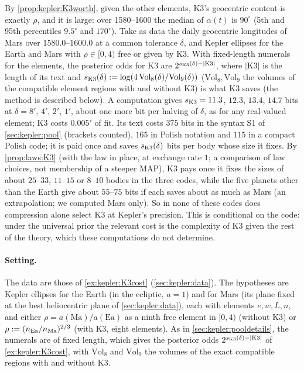 \begin{example}\label{ex:kepler:K3cost}
By \cref{prop:kepler:K3worth}, given the other elements, $\mathrm{K3}$'s geocentric content is exactly $\rho$, and it is large: over 1580--1600 the median of $\alpha(t)$ is $90^\circ$ (5th and 95th percentiles $9.5^\circ$ and $170^\circ$). Take as data the daily geocentric longitudes of Mars over 1580.0--1600.0 at a common tolerance $\delta$, and Kepler ellipses for the Earth and Mars with $\rho\in[0,4)$ free or given by $\mathrm{K3}$. With fixed-length numerals for the elements, the posterior odds for $\mathrm{K3}$ are $2^{s_{\rm K3}(\delta)-\lvert\mathrm{K3}\rvert}$, where $\lvert\mathrm{K3}\rvert$ is the length of its text and $s_{\rm K3}(\delta):=\log(4\,\mathrm{Vol}_8(\delta)/\mathrm{Vol}_9(\delta))$ ($\mathrm{Vol}_8,\mathrm{Vol}_9$ the volumes of the compatible element regions with and without $\mathrm{K3}$) is what $\mathrm{K3}$ saves (the method is described below). A computation gives $s_{\rm K3}=11.3$, $12.3$, $13.4$, $14.7$ bits at $\delta=8'$, $4'$, $2'$, $1'$, about one more bit per halving of $\delta$, as for any real-valued element; $\mathrm{K3}$ costs $0.005'$ of fit. Its text costs $375$ bits in the syntax S1 of \cref{sec:kepler:pool} (brackets counted), $165$ in Polish notation and $115$ in a compact Polish code; it is paid once and saves $s_{\rm K3}(\delta)$ bits per body whose size it fixes. By \cref{prop:laws:K3} (with the law in place, at exchange rate $1$; a comparison of law choices, not membership of a steeper MAP), $\mathrm{K3}$ pays once it fixes the sizes of about $25$--$33$, $11$--$15$ or $8$--$10$ bodies in the three codes, while the five planets other than the Earth give about $55$--$75$ bits if each saves about as much as Mars (an extrapolation; we computed Mars only). So in none of these codes does compression alone select $\mathrm{K3}$ at Kepler's precision. This is conditional on the code: under the universal prior the relevant cost is the complexity of $\mathrm{K3}$ given the rest of the theory, which these computations do not determine.
\end{example}

\paragraph{Setting.} The data are those of \cref{ex:kepler:K3cost} (\cref{sec:kepler:data}). The hypotheses are Kepler ellipses for the Earth (in the ecliptic, $a=1$) and for Mars (its plane fixed at the best heliocentric plane of \cref{sec:kepler:data}), each with elements $e,w,L,n$, and either $\rho=a(\mathrm{Ma})/a(\mathrm{Ea})$ as a ninth free element in $[0,4)$ (without $\mathrm{K3}$) or $\rho:=(n_{\rm Ea}/n_{\rm Ma})^{2/3}$ (with $\mathrm{K3}$, eight elements). As in \cref{sec:kepler:pooldetails}, the numerals are of fixed length, which gives the posterior odds $2^{s_{\rm K3}(\delta)-\lvert\mathrm{K3}\rvert}$ of \cref{ex:kepler:K3cost}, with $\mathrm{Vol}_8$ and $\mathrm{Vol}_9$ the volumes of the exact compatible regions with and without $\mathrm{K3}$.


